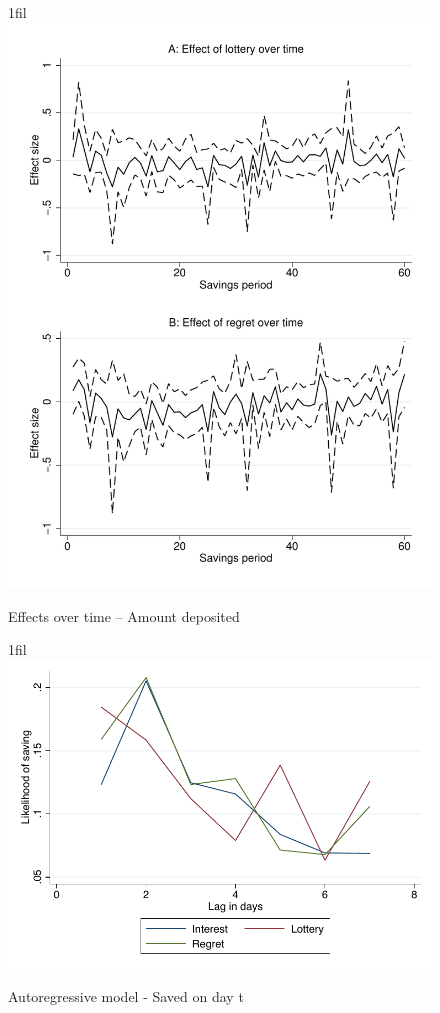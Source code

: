\documentclass[10pt]{article}
\makeatletter
\newcommand*{\centerfloat}{%
  \parindent \z@
  \leftskip \z@ \@plus 1fil \@minus \textwidth
  \rightskip\leftskip
  \parfillskip \z@skip}
\makeatother
\begin{document}
        \begin{figure}[h]
        \centering
        \caption{Effects over time -- Amount deposited}
        \centerfloat
        \includegraphics[width=\textwidth]{../../figures/line-timemobile_depositamount.pdf}
        \end{figure}

		\begin{figure}[h]
		\centering
		\caption{Autoregressive model - Saved on day t}
		\centerfloat
		\includegraphics[width=\textwidth]{../../figures/line-ar.pdf}
		\end{figure}
\end{document}
